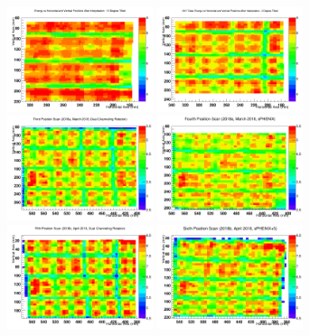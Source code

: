 \documentclass[hidelinks,11pt]{article}
\numberwithin{figure}{section}
\numberwithin{table}{section}
\begin{document}
\begin{figure}[hbtp]
\begin{center}
\includegraphics[width=0.38\textwidth]{Plots/InterMean/Inter20172ndScan.png}
\includegraphics[width=0.38\textwidth]{Plots/InterMean/Inter20173rdScan.png}
\includegraphics[width=0.38\textwidth]{Plots/InterMean/Inter20183rdScan.png}
\includegraphics[width=0.38\textwidth]{Plots/InterMean/Inter20184thScan.png}
\includegraphics[width=0.38\textwidth]{Plots/InterMean/Inter20185thScan.png}
\includegraphics[width=0.38\textwidth]{Plots/InterMean/Inter20186thScan.png}

\end{center}
\end{figure}
\end{document}
